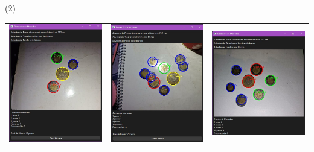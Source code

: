 \begin{frame}{\citetitle{\EntradaBibtex} (2)}


\begin{center}
	\begin{tabular}{ccc}
		\includegraphics[width=0.32\linewidth]{2024_ConteoMonedasEscritorio/figs/ct1b.jpeg} &
		\includegraphics[width=0.32\linewidth]{2024_ConteoMonedasEscritorio/figs/ct2b.jpeg} & 
		\includegraphics[width=0.36\linewidth]{2024_ConteoMonedasEscritorio/figs/d.jpg}\\
	\end{tabular}
\end{center}





\end{frame}

%



